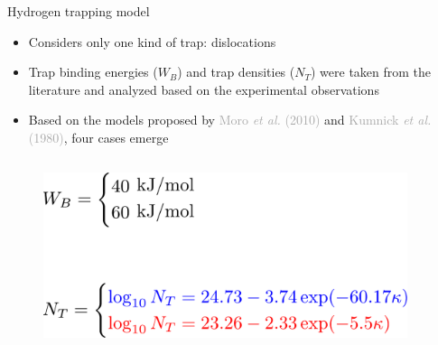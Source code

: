 \documentclass[9pt]{beamer}
\begin{document}
\begin{frame}{Hydrogen trapping model}

\begin{itemize}
	\item Considers only one kind of trap: dislocations
	\vspace{0.1cm}
	\item Trap binding energies ($W_B$) and trap densities ($N_T$) were taken from the literature and analyzed based on the experimental observations
	\vspace{0.1cm}
	\item Based on the models proposed by \textcolor{darkgray}{Moro \textit{et al.} (2010)} and \textcolor{darkgray}{Kumnick \textit{et al.} (1980)}, four cases emerge
\end{itemize}

\begin{columns}
	\begin{column}{0.55\textwidth}
	\begin{figure}
		\centering
		\includegraphics[width=0.95\textwidth]{Images/cases.pdf} \\
	\end{figure}
	\end{column}
	

\end{columns}
\end{frame}
\end{document}
